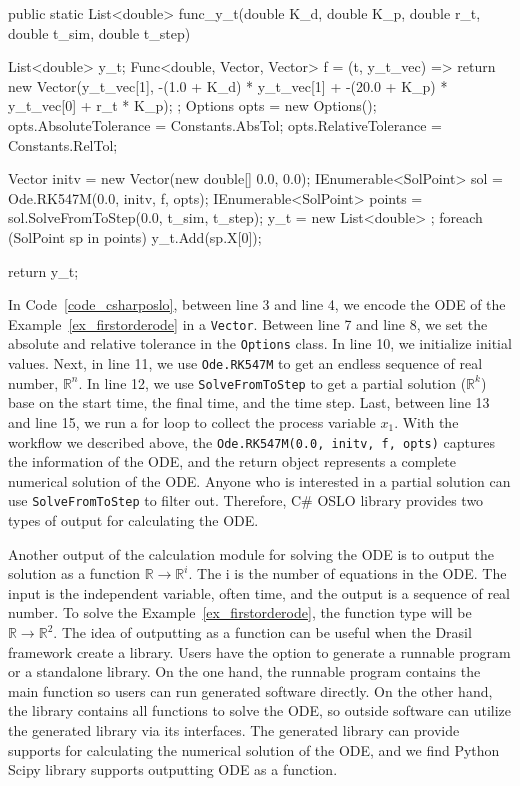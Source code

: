 \begin{listing}[ht]
\begin{csharp1}
public static List<double> func_y_t(double K_d, double K_p, double r_t, double t_sim, double t_step) {
    List<double> y_t;
    Func<double, Vector, Vector> f = (t, y_t_vec) => {
        return new Vector(y_t_vec[1], -(1.0 + K_d) * y_t_vec[1] + -(20.0 + K_p) * y_t_vec[0] + r_t * K_p);
    };
    Options opts = new Options();
    opts.AbsoluteTolerance = Constants.AbsTol;
    opts.RelativeTolerance = Constants.RelTol;
    
    Vector initv = new Vector(new double[] {0.0, 0.0});
    IEnumerable<SolPoint> sol = Ode.RK547M(0.0, initv, f, opts);
    IEnumerable<SolPoint> points = sol.SolveFromToStep(0.0, t_sim, t_step);
    y_t = new List<double> {};
    foreach (SolPoint sp in points) {
        y_t.Add(sp.X[0]);
    }
    
    return y_t;
}
\end{csharp1}
\label{code_csharposlo}
\end{listing}

In Code~\ref{code_csharposlo}, between line 3 and line 4, we encode the ODE of the Example~\ref{ex_firstorderode} in a \verb|Vector|. Between line 7 and line 8, we set the absolute and relative tolerance in the \verb|Options| class. In line 10, we initialize initial values. Next, in line 11, we use \verb|Ode.RK547M| to get an endless sequence of real number, $\mathbb{R}^n$. In line 12, we use \verb|SolveFromToStep| to get a partial solution ($\mathbb{R}^k$) base on the start time, the final time, and the time step. Last, between line 13 and line 15, we run a for loop to collect the process variable $x_1$. With the workflow we described above, the \verb|Ode.RK547M(0.0, initv, f, opts)| captures the information of the ODE, and the return object represents a complete numerical solution of the ODE. Anyone who is interested in a partial solution can use \verb|SolveFromToStep| to filter out. Therefore, C\# OSLO library provides two types of output for calculating the ODE.

Another output of the calculation module for solving the ODE is to output the solution as a function $\mathbb{R} \rightarrow \mathbb{R}^i$. The i is the number of equations in the ODE. The input is the independent variable, often time, and the output is a sequence of real number. To solve the Example~\ref{ex_firstorderode}, the function type will be $\mathbb{R} \rightarrow \mathbb{R}^2$. The idea of outputting as a function can be useful when the Drasil framework create a library. Users have the option to generate a runnable program or a standalone library. On the one hand, the runnable program contains the main function so users can run generated software directly. On the other hand, the library contains all functions to solve the ODE, so outside software can utilize the generated library via its interfaces. The generated library can provide supports for calculating the numerical solution of the ODE, and we find Python Scipy library supports outputting ODE as a function.

